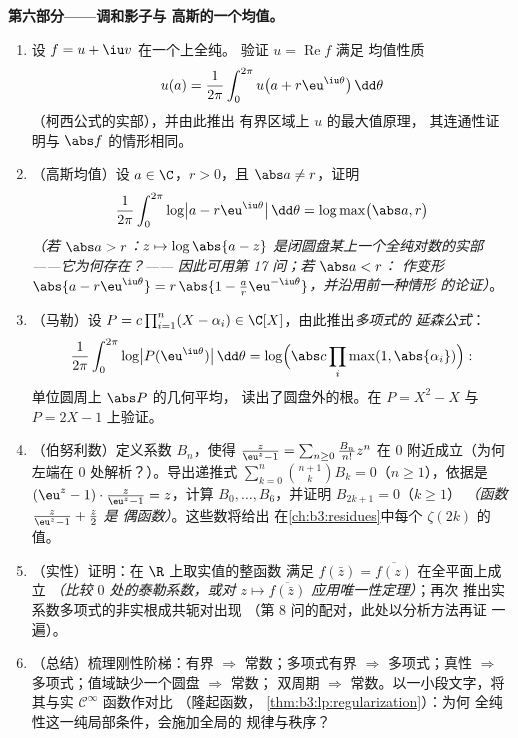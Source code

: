 \begin{problem}
\medskip
\noindent\textbf{第六部分——调和影子与
高斯的一个均值。}
\begin{enumerate}[resume]
  \item 设 $f = u + \iu v$ 在一个上全纯。
        验证 $u = \operatorname{Re}f$ 满足
        均值性质
        \[
        u(a) = \frac1{2\pi}\int_0^{2\pi}
        u\bigl(a + r\eu^{\iu\theta}\bigr)\,\dd\theta
        \]
        （柯西公式的实部），并由此推出
        有界区域上 $u$ 的最大值原理，
        其连通性证明与 $\abs f$ 的情形相同。
  \item （高斯均值）设 $a \in \C$，$r > 0$，且
        $\abs a \neq r$，证明
        \[
        \frac1{2\pi}\int_0^{2\pi}
        \log\bigl|a - r\eu^{\iu\theta}\bigr|\,\dd\theta
        = \log\max\bigl(\abs a, r\bigr)
        \]
        \emph{（若 $\abs a > r$：$z \mapsto \log\abs{a - z}$
        是闭圆盘某上一个全纯对数的实部
        ——它为何存在？——
        因此可用第 17 问；若 $\abs a < r$：
        作变形 $\abs{a - r\eu^{\iu\theta}} = r\,\abs{1 -
        \frac ar\eu^{-\iu\theta}}$，并沿用前一种情形
        的论证）}。
  \item （马勒）设 $P = c\prod_{i=1}^n(X -
        \alpha_i) \in \C[X]$，由此推出\emph{多项式的
        延森公式}：
        \[
        \frac1{2\pi}\int_0^{2\pi}\log\bigl|P(\eu^{\iu\theta})
        \bigr|\,\dd\theta
        = \log\Bigl(\abs c\prod_{i}\max(1,
        \abs{\alpha_i})\Bigr) :
        \]
        单位圆周上 $\abs P$ 的几何平均，
        读出了圆盘外的根。在 $P =
        X^2 - X$ 与 $P = 2X - 1$ 上验证。
  \item （伯努利数）定义系数 $B_n$，使得
        $\frac{z}{\eu^z - 1} = \sum_{n\geq0}\frac{B_n}{n!}
        z^n$ 在 $0$ 附近成立（为何左端在
        $0$ 处解析？）。导出递推式
        $\sum_{k=0}^{n}\binom{n+1}kB_k = 0$（$n \geq 1$），依据是
        $(\eu^z - 1)\cdot\frac z{\eu^z-1} = z$，计算 $B_0,
        \dots, B_6$，并证明 $B_{2k+1} = 0$（$k \geq 1$）
        \emph{（函数 $\frac z{\eu^z-1} + \frac z2$ 是
        偶函数）}。这些数将给出
        在\cref{ch:b3:residues}中每个 $\zeta(2k)$ 的值。
  \item （实性）证明：在 $\R$ 上取实值的整函数
        满足 $f(\bar z) =
        \overline{f(z)}$ 在全平面上成立 \emph{（比较
        $0$ 处的泰勒系数，或对
        $z \mapsto \overline{f(\bar z)}$ 应用唯一性定理）}；再次
        推出实系数多项式的非实根成共轭对出现
        （第 8 问的配对，此处以分析方法再证
        一遍）。
  \item （总结）梳理刚性阶梯：有界
        $\Rightarrow$ 常数；多项式有界
        $\Rightarrow$ 多项式；真性 $\Rightarrow$
        多项式；值域缺少一个圆盘 $\Rightarrow$ 常数；
        双周期 $\Rightarrow$ 常数。以一小段文字，将其与实
        $\mathcal C^\infty$ 函数作对比
        （隆起函数，
        \cref{thm:b3:lp:regularization}）：为何
        全纯性这一纯局部条件，会施加全局的
        规律与秩序？
\end{enumerate}


\end{problem}
